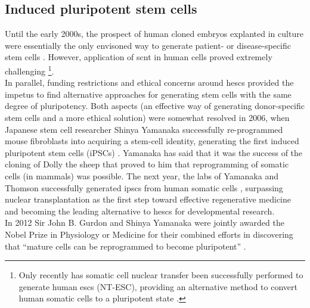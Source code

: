 
\newpage

\subsection{Induced pluripotent stem cells}
\label{sec:ipsc}

Until the early 2000s, the prospect of human cloned embryos explanted in culture were essentially the only envisoned way to generate patient- or disease-specific stem cells \cite{yamanaka2007strategies}.
However, application of \gls{scnt} in human cells proved extremely challenging \cite{fulka2013ups}\footnote{Only recently has somatic cell nuclear transfer been successfully performed to generate human \glspl{esc} (NT-ESC), providing an alternative method to convert human somatic cells to a pluripotent state \cite{tachibana2013human}.}. \\

In parallel, funding restrictions and ethical concerns around \glspl{hesc} provided the impetus to find alternative approaches for generating stem cells with the same degree of pluripotency.
Both aspects (an effective way of generating donor-specific stem cells and a more ethical solution) were somewhat resolved in 2006, when Japanese stem cell researcher Shinya Yamanaka successfully re-programmed mouse fibroblasts into acquiring a stem-cell identity, generating the first induced pluripotent stem cells (iPSCs) \cite{takahashi2006induction}.
Yamanaka has said that it was the success of the cloning of Dolly the sheep that proved to him that reprogramming of somatic cells (in mammals) was possible.
The next year, the labs of Yamanaka and Thomson successfully generated \glspl{ipsc} from human somatic cells \cite{takahashi2006induction, takahashi2007induction, yu2007induced}, surpassing nuclear transplantation as the first step toward effective regenerative medicine and becoming the leading alternative to \glspl{hesc} for developmental research.\\

In 2012 Sir John B. Gurdon and Shinya Yamanaka were jointly awarded the Nobel Prize in Physiology or Medicine for their combined efforts in discovering that “mature cells can be reprogrammed to become pluripotent” \cite{nobel2012press}.    

